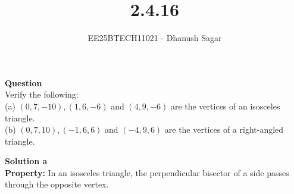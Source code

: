 \documentclass[journal]{IEEEtran}
\begin{document}



\title{2.4.16}
\author{EE25BTECH11021 - Dhanush Sagar
}
{\let\newpage\relax\maketitle}

\renewcommand{\thefigure}{\theenumi}
\renewcommand{\thetable}{\theenumi}
\setlength{\intextsep}{10pt} %


\renewcommand{\thetable}{\theenumi}


\textbf{Question} \\
Verify the following:\\  
(a) $(0,7,-10), (1,6,-6)$ and $(4,9,-6)$ are the vertices of an isosceles triangle.  \\
(b) $(0,7,10), (-1,6,6)$ and $(-4,9,6)$ are the vertices of a right-angled triangle.  


\textbf{Solution a}\\
\textbf{Property:} In an isosceles triangle, the perpendicular bisector of a side passes through the opposite vertex.
\end{document}
